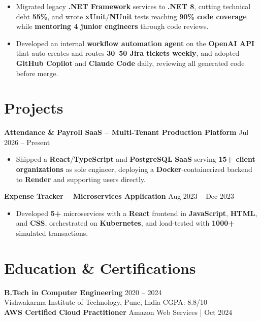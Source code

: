 \documentclass[a4paper,10pt]{article}
\begin{document}
\begin{itemize}[leftmargin=*]
    \item Migrated legacy \textbf{.NET Framework} services to \textbf{.NET 8}, cutting technical debt \textbf{55\%}, and wrote \textbf{xUnit}/\textbf{NUnit} tests reaching \textbf{90\% code coverage} while \textbf{mentoring 4 junior engineers} through code reviews.
    \item Developed an internal \textbf{workflow automation agent} on the \textbf{OpenAI API} that auto-creates and routes \textbf{30--50 Jira tickets weekly}, and adopted \textbf{GitHub Copilot} and \textbf{Claude Code} daily, reviewing all generated code before merge.
\end{itemize}

\section*{Projects}

\textbf{Attendance \& Payroll SaaS -- Multi-Tenant Production Platform} \hfill Jul 2026 -- Present
\begin{itemize}[leftmargin=*]
    \item Shipped a \textbf{React}/\textbf{TypeScript} and \textbf{PostgreSQL} \textbf{SaaS} serving \textbf{15+ client organizations} as sole engineer, deploying a \textbf{Docker}-containerized backend to \textbf{Render} and supporting users directly.
\end{itemize}

\textbf{Expense Tracker -- Microservices Application} \hfill Aug 2023 -- Dec 2023
\begin{itemize}[leftmargin=*]
    \item Developed \textbf{5+} microservices with a \textbf{React} frontend in \textbf{JavaScript}, \textbf{HTML}, and \textbf{CSS}, orchestrated on \textbf{Kubernetes}, and load-tested with \textbf{1000+} simulated transactions.
\end{itemize}

\section*{Education \& Certifications}
\textbf{B.Tech in Computer Engineering} \hfill 2020 -- 2024 \\
Vishwakarma Institute of Technology, Pune, India \hfill CGPA: 8.8/10 \\
\textbf{AWS Certified Cloud Practitioner} \hfill Amazon Web Services \;|\; Oct 2024
\end{document}
